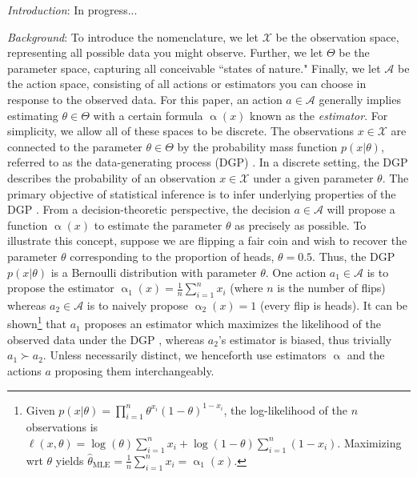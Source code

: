 \documentclass[letterpaper,12pt]{article}
\newcommand{\given}{|}
\begin{document}
	\doublespacing
	
\textit{Introduction}: In progress...

\textit{Background}: To introduce the nomenclature, we let $\mathcal{X}$ be the observation space, representing all possible data you might observe. Further, we let ${\Theta}$ be the parameter space, capturing all conceivable ``states of nature." Finally, we let $\mathcal{A}$ be the action space, consisting of all actions or estimators you can choose in response to the observed data. For this paper, an action $a \in \mathcal{A}$ generally implies estimating $\theta \in \Theta$ with a certain formula $\upalpha(x)$ known as the \textit{estimator}. For simplicity, we allow all of these spaces to be discrete. The observations $x \in \mathcal{X}$ are connected to the parameter $\theta \in \Theta$ by the probability mass function $p(x \given \theta)$, referred to as the data-generating process (DGP) \cite{tu2004data}. In a discrete setting, the DGP describes the probability of an observation $x \in \mathcal{X}$ under a given parameter $\theta$. The primary objective of statistical inference is to infer underlying properties of the DGP \cite{upton2008oxford}. From a decision-theoretic perspective, the decision $a \in \mathcal{A}$ will propose a function $\upalpha(x)$ to estimate the parameter $\theta$ as precisely as possible. To illustrate this concept, suppose we are flipping a fair coin and wish to recover the parameter $\theta$ corresponding to the proportion of heads, $\theta = 0.5$. Thus, the DGP $p(x \given \theta)$ is a Bernoulli distribution with parameter $\theta$. One action $a_1 \in \mathcal{A}$ is to propose the estimator $\upalpha_1(x) = \frac{1}{n}\sum_{i = 1}^n x_i$ (where $n$ is the number of flips) whereas $a_2 \in \mathcal{A}$ is to naively propose $\upalpha_2 (x) = 1$ (every flip is heads). It can be shown\footnote{ Given $p(x\given \theta) = \prod_{i = 1}^n\theta^{x_i}(1-\theta)^{1-x_i}$, the log-likelihood of the $n$ observations is $\ell(x, \theta) = \log(\theta) \sum_{i = 1}^n x_i + \log(1 - \theta) \sum_{i = 1}^n (1 - x_i)$. Maximizing wrt $\theta$ yields $\hat{\theta}_{\text{MLE}} = \frac{1}{n}\sum_{i = 1}^n x_i = \upalpha_1(x)$.} that $a_1$ proposes an estimator which maximizes the likelihood of the observed data under the DGP \cite{rossi2018}, whereas $a_2$'s estimator is biased, thus trivially $a_1 \succ a_2$. Unless necessarily distinct, we henceforth use estimators $\upalpha$ and the actions $a$ proposing them interchangeably. 
\end{document}
